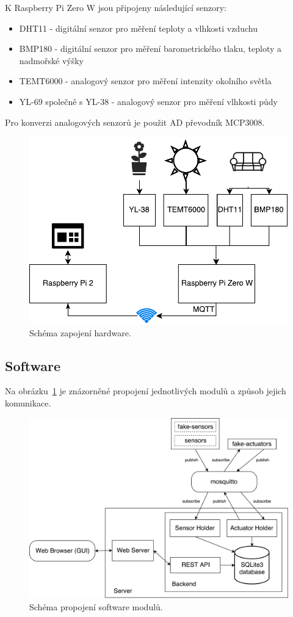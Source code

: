 \documentclass[11pt,a4paper]{article}
\begin{document}
K Raspberry Pi Zero W jsou připojeny následující senzory:

\begin{itemize}
    \item DHT11 - digitální senzor pro měření teploty a vlhkosti vzduchu
    \item BMP180 - digitální senzor pro měření barometrického tlaku, teploty a nadmořské výšky
    \item TEMT6000 - analogový senzor pro měření intenzity okolního světla
    \item YL-69 společně s YL-38 - analogový senzor pro měření vlhkosti půdy
\end{itemize}

Pro konverzi analogových senzorů je použit AD převodník MCP3008.

\begin{figure}[htb]
    \centering
    \includegraphics[width=0.5\linewidth]{weather-station-scheme}
    \caption{Schéma zapojení hardware.}
\end{figure}

\subsection{Software}\label{subsec:sw}
Na obrázku~\ref{fig:sw-scheme} je znázorněné propojení jednotlivých modulů a způsob jejich komunikace.

\begin{figure}[htb]
    \centering
    \includegraphics[width=0.75\linewidth]{sw-scheme}
    \caption{Schéma propojení software modulů.}
    \label{fig:sw-scheme}
\end{figure}
\end{document}
